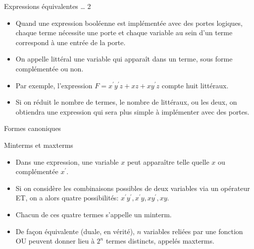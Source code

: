 \documentclass[presentation]{beamer}
\begin{document}
\begin{frame}[label={sec:orga126669}]{Expressions équivalentes \ldots{} 2}
\begin{itemize}
\item Quand une expression booléenne est implémentée avec des portes logiques, chaque terme nécessite une porte et chaque variable au sein d'un terme correspond à une entrée de la porte.

\item On appelle \alert{littéral} une variable qui apparaît dans un terme, sous forme complémentée ou non.

\item Par exemple, l'expression \(F = x^\prime y^\prime z + xz + xy^\prime z\) compte huit littéraux.

\item Si on réduit le nombre de termes, le nombre de littéraux, ou les deux, on obtiendra une expression qui sera plus simple à implémenter avec des portes.
\end{itemize}
\end{frame}

\begin{frame}[label={sec:orgf9637bf}]{Formes canoniques}
\begin{block}{Minterms et maxterms}
\begin{itemize}
\item Dans une expression, une variable \(x\) peut apparaître telle quelle \(x\) ou complémentée \(x^\prime\).

\item Si on considère les combinaisons possibles de deux variables via un opérateur ET, on a alors quatre possibilités: \(x^\prime y^\prime, x^\prime y, x y^\prime,x y\).

\item Chacun de ces quatre termes s'appelle un \alert{minterm}.

\item De façon équivalente (duale, en vérité), \(n\) variables reliées par une fonction OU peuvent donner lieu à \(2^n\) termes distincts, appelés \alert{maxterms}.
\end{itemize}
\end{block}
\end{frame}
\end{document}
